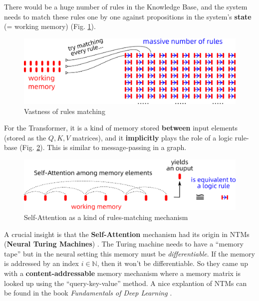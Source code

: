 \documentclass[runningheads]{llncs}
\begin{document}
There would be a huge number of rules in the Knowledge Base, and the system needs to match these rules one by one against propositions in the system's \textbf{state} (= working memory) (Fig. \ref{rules-matching.png}).
\begin{figure}[H]
	\centering
	\includegraphics[scale=0.5]{rules-matching.png}
	\caption{Vastness of rules matching}
	\label{rules-matching.png}
\end{figure}

For the Transformer, it is a kind of memory stored \textbf{between} input elements (stored as the $Q, K, V$ matrices), and it \textbf{implicitly} plays the role of a logic rule-base (Fig. \ref{Attention-as-Rete}).  This is similar to message-passing in a graph.
\begin{figure}[H]
	\centering
	\includegraphics[scale=0.5]{Attention-as-Rete.png}
	\caption{Self-Attention as a kind of rules-matching mechanism}
	\label{Attention-as-Rete}
\end{figure}

A crucial insight is that the \textbf{Self-Attention} mechanism had its origin in NTMs (\textbf{Neural Turing Machines}) \cite{Graves2014}.  The Turing machine needs to have a ``memory tape'' but in the neural setting this memory must be \textit{differentiable}.  If the memory is addressed by an index $i \in \mathbb{N}$, then it won't be differentiable.  So they came up with a \textbf{content-addressable} memory mechanism where a memory matrix is looked up using the ``query-key-value'' method.  A nice explantion of NTMs can be found in the book \textit{Fundamentals of Deep Learning} \cite{Buduma2017}.
\end{document}
